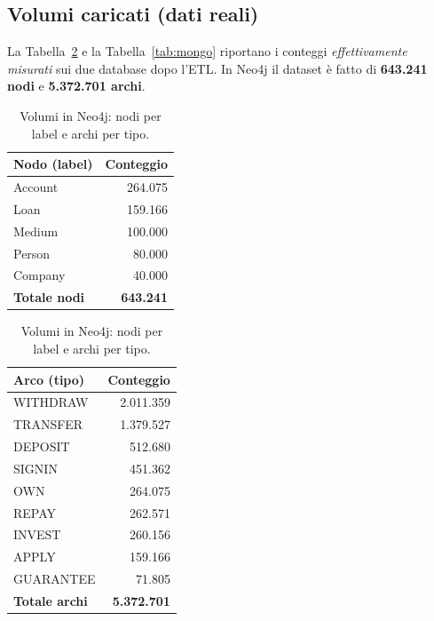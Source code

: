 \documentclass[11pt,a4paper]{article}
\begin{document}
\subsection{Volumi caricati (dati reali)}

La Tabella~\ref{tab:neo4j} e la Tabella~\ref{tab:mongo} riportano i conteggi
\emph{effettivamente misurati} sui due database dopo l'ETL. In Neo4j il dataset
\`e fatto di \textbf{643.241 nodi} e \textbf{5.372.701 archi}.

\begin{table}[h]
\centering
\begin{minipage}{0.48\textwidth}
\centering
\begin{tabular}{lr}
\toprule
\textbf{Nodo (label)} & \textbf{Conteggio} \\
\midrule
Account & 264.075 \\
Loan    & 159.166 \\
Medium  & 100.000 \\
Person  & 80.000 \\
Company & 40.000 \\
\midrule
\textbf{Totale nodi} & \textbf{643.241} \\
\bottomrule
\end{tabular}
\end{minipage}
\hfill
\begin{minipage}{0.48\textwidth}
\centering
\begin{tabular}{lr}
\toprule
\textbf{Arco (tipo)} & \textbf{Conteggio} \\
\midrule
WITHDRAW  & 2.011.359 \\
TRANSFER  & 1.379.527 \\
DEPOSIT   & 512.680 \\
SIGNIN    & 451.362 \\
OWN       & 264.075 \\
REPAY     & 262.571 \\
INVEST    & 260.156 \\
APPLY     & 159.166 \\
GUARANTEE & 71.805 \\
\midrule
\textbf{Totale archi} & \textbf{5.372.701} \\
\bottomrule
\end{tabular}
\end{minipage}
\caption{Volumi in Neo4j: nodi per label e archi per tipo.}
\label{tab:neo4j}
\end{table}
\end{document}
